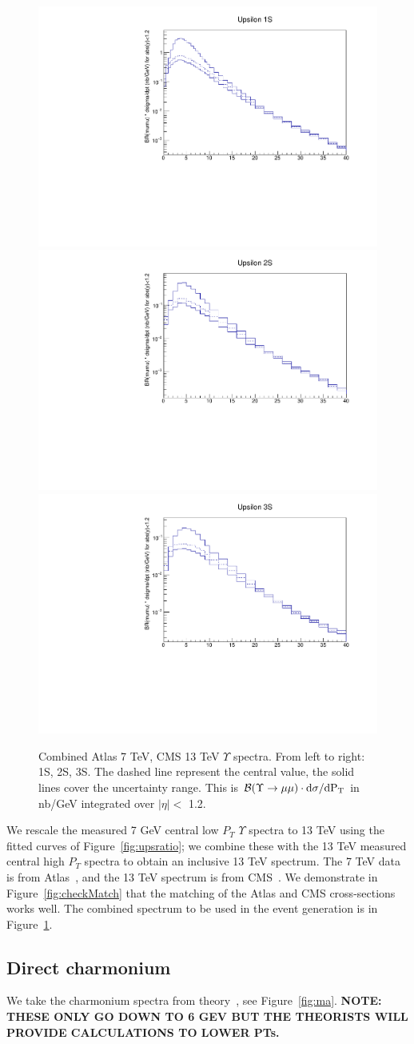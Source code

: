 \documentclass[12pt]{article}
\begin{document}
\begin{figure}
\begin{adjustwidth}{-3cm}{-3cm}
\centering
\includegraphics[width=0.32\linewidth]{../oniaDirect/upsilon/ups1s-full.pdf}
\includegraphics[width=0.32\linewidth]{../oniaDirect/upsilon/ups2s-full.pdf}
\includegraphics[width=0.32\linewidth]{../oniaDirect/upsilon/ups3s-full.pdf}
\end{adjustwidth}
\caption{\protect Combined Atlas 7 TeV, CMS 13 TeV $\Upsilon$ spectra.
  From left to right: 1S, 2S, 3S. 
The dashed line represent the central value, the solid
  lines cover the uncertainty range.  This is ${\cal B}(\Upsilon \to \mu\mu) \cdot
  \rm{d}\sigma/\rm{d}P_T$ in nb/GeV integrated
  over $|\eta| <$ 1.2.}
\label{fig:upsFinal}
\end{figure}

  
  We rescale the measured 7 GeV central low $P_T$ $\Upsilon$ spectra to 13 TeV using the
  fitted curves of Figure~\ref{fig:upsratio};  we combine these with the 13 TeV measured
  central high $P_T$ spectra to obtain an inclusive 13 TeV spectrum.  The 7 TeV data
  is from Atlas~\cite{Aad:2012dlq}, and the 13 TeV spectrum is from
  CMS~\cite{Sirunyan:2017qdw}. We demonstrate in Figure~\ref{fig:checkMatch} that the
  matching of the Atlas and CMS cross-sections works well.  The combined
  spectrum to be used in the event generation is in Figure~\ref{fig:upsFinal}.

  
 \clearpage
\subsection{Direct charmonium}
We take the charmonium spectra from theory~\cite{Ma:2010yw, Ma:2010jj},
see Figure~\ref{fig:ma}.  {\bf NOTE: THESE ONLY GO DOWN TO 6 GEV BUT
  THE THEORISTS WILL PROVIDE CALCULATIONS TO LOWER PTs.}
\end{document}

